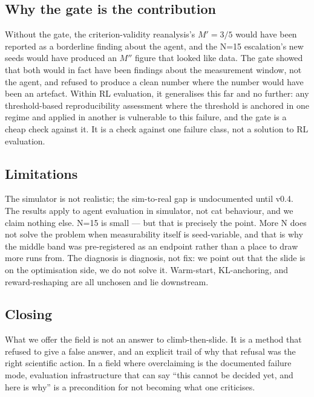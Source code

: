 \documentclass{article}
\begin{document}
\subsection{Why the gate is the contribution}
\label{sec:4.2}

Without the gate, the criterion-validity reanalysis's $M' = 3/5$ would have been reported as a borderline finding about the agent, and the N=15 escalation's new seeds would have produced an $M''$ figure that looked like data. The gate showed that both would in fact have been findings about the measurement window, not the agent, and refused to produce a clean number where the number would have been an artefact. Within RL evaluation, it generalises this far and no further: any threshold-based reproducibility assessment where the threshold is anchored in one regime and applied in another is vulnerable to this failure, and the gate is a cheap check against it. It is a check against one failure class, not a solution to RL evaluation.

\subsection{Limitations}
\label{sec:4.3}

The simulator is not realistic; the sim-to-real gap is undocumented until v0.4. The results apply to agent evaluation in simulator, not cat behaviour, and we claim nothing else. N=15 is small --- but that is precisely the point. More N does not solve the problem when measurability itself is seed-variable, and that is why the middle band was pre-registered as an endpoint rather than a place to draw more runs from. The diagnosis is diagnosis, not fix: we point out that the slide is on the optimisation side, we do not solve it. Warm-start, KL-anchoring, and reward-reshaping are all unchosen and lie downstream.

\subsection{Closing}
\label{sec:4.4}

What we offer the field is not an answer to climb-then-slide. It is a method that refused to give a false answer, and an explicit trail of why that refusal was the right scientific action. In a field where overclaiming is the documented failure mode, evaluation infrastructure that can say ``this cannot be decided yet, and here is why'' is a precondition for not becoming what one criticises.
\end{document}
